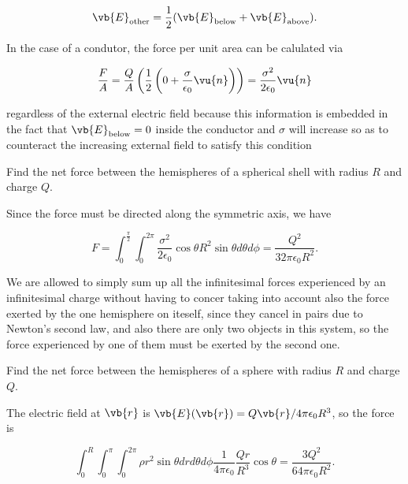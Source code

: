 \documentclass[english,a4paper,12pt]{report}
\begin{document}
\begin{equation}
    \vb{E} _{\text{other} } = \frac{1}{2}(\vb{E} _{\text{below} } + \vb{E} _{\text{above} }  ).   
\end{equation}

In the case of a condutor, the force per unit area can be calulated via

\begin{equation}
    \frac{F}{A} = \frac{Q}{A}\left( \frac{1}{2} \left( 0 + \frac{\sigma }{\epsilon _{0} }\vu{n}   \right)  \right) = \frac{\sigma ^2}{2\epsilon _{0} }\vu{n}
\end{equation}

regardless of the external electric field because this information is embedded in the fact that \(\vb{E} _{\text{below} } = 0 \) inside the conductor and \(\sigma \) will increase so as to counteract the increasing external field to satisfy this condition  

{Find the net force between the hemispheres of a spherical shell with radius \(R\) and charge \(Q\).}
{Since the force must be directed along the symmetric axis, we have
		
\begin{equation}
    F = \int_{0}^{\frac{\pi }{2} } \int_{0}^{2\pi } \frac{\sigma ^2}{2 \epsilon_0} \cos \theta R^2 \sin \theta d\theta d\phi = \frac{Q^2}{32\pi  \epsilon_0 R^2 }.
\end{equation}

We are allowed to simply sum up all the infinitesimal forces experienced by an infinitesimal charge without having to concer taking into account also the force exerted by the one hemisphere on iteself, since they cancel in pairs due to Newton's second law, and also there are only two objects in this system, so the force experienced by one of them must be exerted by the second one.} 

{Find the net force between the hemispheres of a sphere with radius \(R\) and charge \(Q\).}
{The electric field at \(\vb{r} \) is \( \vb{E} (\vb{r} ) = Q \vb{r} /4\pi \epsilon _{0} R^3 \), so the force is  
		
\begin{equation}
    \int_{0}^{R} \int_{0}^{\pi } \int_{0}^{2\pi }    \rho r^2\sin \theta drd\theta d\phi  \frac{1}{4\pi\epsilon_0} \frac{Qr}{R^3 } \cos \theta = \frac{3Q^2}{64\pi  \epsilon_0 R^2 }.	
\end{equation}
} 
\end{document}
